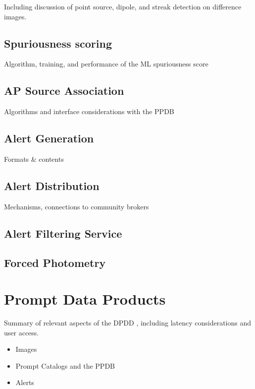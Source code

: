 Including discussion of point source, dipole, and streak detection on difference images.  


\subsection{Spuriousness scoring}

Algorithm, training, and performance of the ML spuriousness score

\subsection{AP Source Association}

Algorithms and interface considerations with the PPDB


\subsection{Alert Generation}

Formats \& contents

\subsection{Alert Distribution}

Mechanisms, connections to community brokers

\subsection{Alert Filtering Service}

\subsection{Forced Photometry}


\section{Prompt Data Products}


Summary of relevant aspects of the DPDD \citep{LSE-163}, including latency considerations and user access.

\begin{itemize}
  \item Images
  \item Prompt Catalogs and the PPDB
  \item Alerts
\end{itemize}


